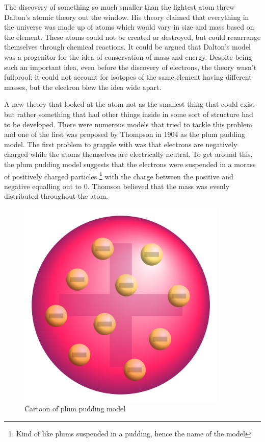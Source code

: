 The discovery of something so much smaller than the lightest atom threw Dalton's atomic theory out the window.
His theory claimed that  everything in the universe was made up of atoms which would vary in size and mass based on the element.
These atoms could not be created or destroyed, but  could reaarrange themselves through chemical reactions.
It could be argued that Dalton's model was a progenitor for the idea of conservation of mass and energy.
Despite being such an important idea, even before the discovery of electrons, the theory wasn't fullproof; it could not account for isotopes of the same element having different masses, but the electron blew the idea wide apart.

A new theory that looked at the atom not as the smallest thing that could exist but rather something that had other things inside in some sort of structure had to be developed.
There were numerous models that tried to tackle this problem and one of the first was proposed by Thompson in 1904 as the plum pudding model.
The first problem to grapple with was that electrons are negatively charged while the atoms themselves are electrically neutral.
To get around this, the plum pudding model suggests that  the electrons were suspended in a morass of positively charged particles
\footnote{Kind of like plums suspended in a pudding, hence the name of the model}
with the charge between the positive  and negative equalling out to 0.
Thomson believed that the mass was evenly distributed throughout the atom.

\begin{figure}[H]
  \centering
  \includegraphics[width=100mm]{figures/plumPudding.png}
  \caption{Cartoon of plum pudding model}
  \label{plumPudding}
\end{figure}

